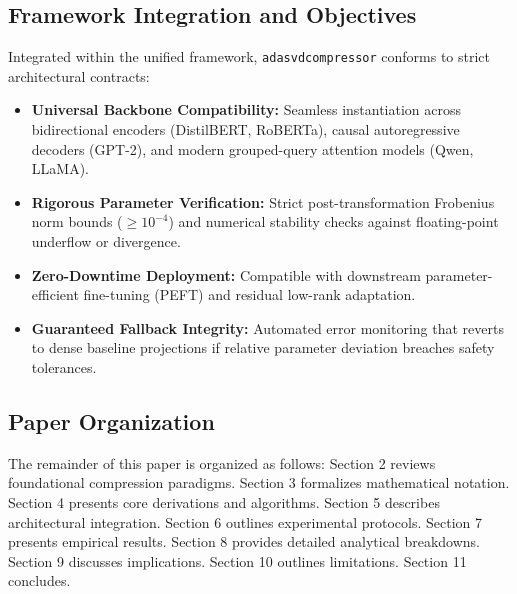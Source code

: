 \subsection{Framework Integration and Objectives}
Integrated within the unified framework, \texttt{adasvdcompressor} conforms to strict architectural contracts:
\begin{itemize}
\item \textbf{Universal Backbone Compatibility:} Seamless instantiation across bidirectional encoders (DistilBERT, RoBERTa), causal autoregressive decoders (GPT-2), and modern grouped-query attention models (Qwen, LLaMA).
\item \textbf{Rigorous Parameter Verification:} Strict post-transformation Frobenius norm bounds ($\ge 10^{-4}$) and numerical stability checks against floating-point underflow or divergence.
\item \textbf{Zero-Downtime Deployment:} Compatible with downstream parameter-efficient fine-tuning (PEFT) and residual low-rank adaptation.
\item \textbf{Guaranteed Fallback Integrity:} Automated error monitoring that reverts to dense baseline projections if relative parameter deviation breaches safety tolerances.
\end{itemize}

\subsection{Paper Organization}
The remainder of this paper is organized as follows: Section 2 reviews foundational compression paradigms. Section 3 formalizes mathematical notation. Section 4 presents core derivations and algorithms. Section 5 describes architectural integration. Section 6 outlines experimental protocols. Section 7 presents empirical results. Section 8 provides detailed analytical breakdowns. Section 9 discusses implications. Section 10 outlines limitations. Section 11 concludes.
